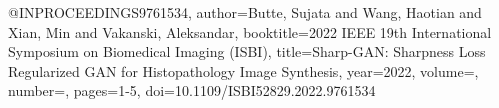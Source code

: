 @INPROCEEDINGS{9761534,
  author={Butte, Sujata and Wang, Haotian and Xian, Min and Vakanski, Aleksandar},
  booktitle={2022 IEEE 19th International Symposium on Biomedical Imaging (ISBI)}, 
  title={Sharp-GAN: Sharpness Loss Regularized GAN for Histopathology Image Synthesis}, 
  year={2022},
  volume={},
  number={},
  pages={1-5},
  doi={10.1109/ISBI52829.2022.9761534}}